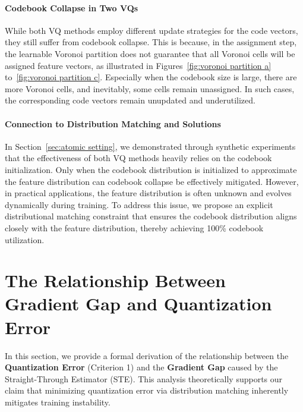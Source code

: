 \paragraph{Codebook Collapse in Two VQs} While both VQ methods employ different update strategies for the code vectors, they still suffer from codebook collapse. This is because, in the assignment step, the learnable Voronoi partition does not guarantee that all Voronoi cells will be assigned feature vectors, as illustrated in Figures~\ref{fig:voronoi partition a} to~\ref{fig:voronoi partition c}. Especially when the codebook size is large, there are more Voronoi cells, and inevitably, some cells remain unassigned. In such cases, the corresponding code vectors remain unupdated and underutilized.

\paragraph{Connection to Distribution Matching and Solutions} In Section~\ref{sec:atomic setting}, we demonstrated through synthetic experiments that the effectiveness of both VQ methods heavily relies on the codebook initialization. Only when the codebook distribution is initialized to approximate the feature distribution can codebook collapse be effectively mitigated. However, in practical applications, the feature distribution is often unknown and evolves dynamically during training. To address this issue, we propose an explicit distributional matching constraint that ensures the codebook distribution aligns closely with the feature distribution, thereby achieving 100\% codebook utilization.
\fi

\section{The Relationship Between Gradient Gap and Quantization Error}
\label{appendix:gradient gap quantization error}

In this section, we provide a formal derivation of the relationship between the \textbf{Quantization Error} (Criterion 1) and the \textbf{Gradient Gap} caused by the Straight-Through Estimator (STE). This analysis theoretically supports our claim that minimizing quantization error via distribution matching inherently mitigates training instability.

